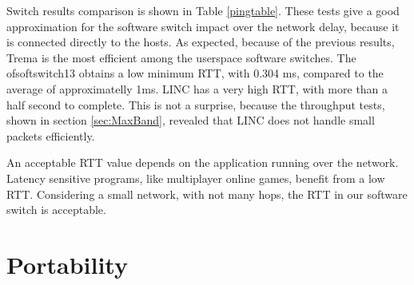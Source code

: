     Switch results comparison is shown in Table \ref{pingtable}. These tests give a good approximation for the software switch impact over the network delay, because it is connected directly to the hosts. As expected, because of the previous results, Trema is the most efficient among the userspace software switches. The ofsoftswitch13 obtains a low minimum RTT, with 0.304 ms, compared to the average of approximatelly 1ms. LINC has a very high RTT, with more than a half second to complete. This is not a surprise, because the throughput tests, shown in section \ref{sec:MaxBand}, revealed that LINC does not handle small packets efficiently.   
    
    An acceptable RTT value depends on the application running over the network. Latency sensitive programs, like multiplayer online games, benefit from a low RTT. Considering a small network, with not many hops, the RTT in our software switch is acceptable.   

    \begin{table}[H]
    \caption{Ping Round Trip Time comparison between software switches}
    \label{pingtable}
    \end{table}

\section{Portability}

